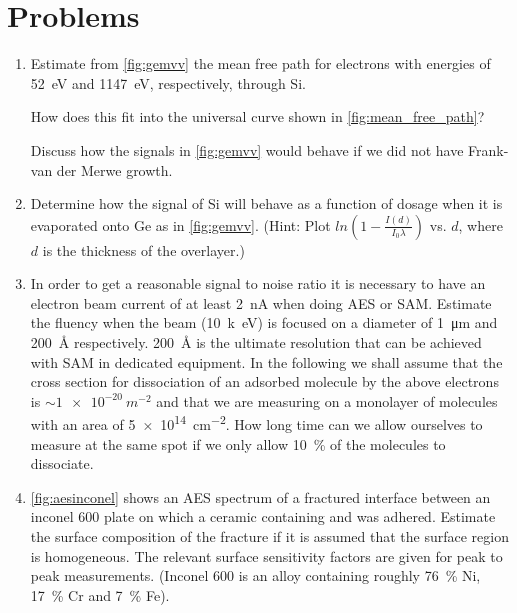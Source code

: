 \section{Problems}
\begin{enumerate}
\item Estimate from \autoref{fig:gemvv} the mean free path for electrons with energies of \SI{52}{\electronvolt} and \SI{1147}{\electronvolt}, respectively, through Si.

How does this fit into the universal curve shown in \autoref{fig:mean_free_path}?

Discuss how the signals in \autoref{fig:gemvv} would behave if we did not have Frank-van der Merwe growth.

\item Determine how the signal of Si will behave as a function of dosage when it is evaporated onto Ge as in \autoref{fig:gemvv}. (Hint: Plot $ln(1-\frac{I(d)}{I_0\lambda})$ vs. $d$, where $d$ is the thickness of the overlayer.)

\item In order to get a reasonable signal to noise ratio it is necessary to have an electron beam current of at least \SI{2}{nA} when doing AES or SAM. Estimate the fluency when the beam (\SI{10}{k\electronvolt}) is focused on a diameter of \SI{1}{\micro m} and \SI{200}{\angstrom} respectively. \SI{200}{\angstrom} is the ultimate resolution that can be achieved with SAM in dedicated equipment. In the following we shall assume that the cross section for dissociation of an adsorbed molecule by the above electrons is $\sim \SI{1e-20}{m^{-2}}$ and that we are measuring on a monolayer of molecules with an area of \SI{5e14}{cm^{-2}}. How long time can we allow ourselves to measure at the same spot if we only allow \SI{10}{\percent} of the molecules to dissociate.

\item \autoref{fig:aesinconel} shows an AES spectrum of a fractured interface between an inconel 600 plate on which a ceramic containing  and  was adhered. Estimate the surface composition of the fracture if it is assumed that the surface region is homogeneous. The relevant surface sensitivity factors are given for peak to peak measurements. (Inconel 600 is an alloy containing roughly \SI{76}{\percent} Ni, \SI{17}{\percent} Cr and \SI{7}{\percent} Fe).


\end{enumerate}
